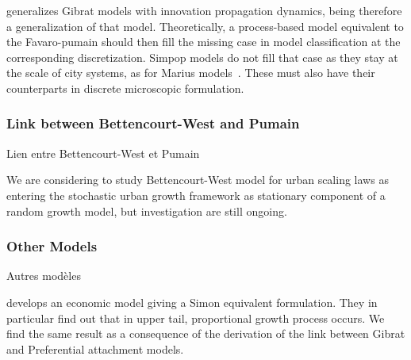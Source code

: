 \cite{favaro2011gibrat} generalizes Gibrat models with innovation propagation dynamics, being therefore a generalization of that model. Theoretically, a process-based model equivalent to the Favaro-pumain should then fill the missing case in model classification at the corresponding discretization. Simpop models do not fill that case as they stay at the scale of city systems, as for Marius models~\cite{cottineau2014evolution}. These must also have their counterparts in discrete microscopic formulation.

\subsubsection{Link between Bettencourt-West and Pumain}{Lien entre Bettencourt-West et Pumain}

We are considering to study Bettencourt-West model for urban scaling laws \cite{bettencourt2008large} as entering the stochastic urban growth framework as stationary component of a random growth model, but investigation are still ongoing.


\subsubsection{Other Models}{Autres modèles}

\cite{gabaix1999zipf} develops an economic model giving a Simon equivalent formulation. They in particular find out that in upper tail, proportional growth process occurs. We find the same result as a consequence of the derivation of the link between Gibrat and Preferential attachment models.

















